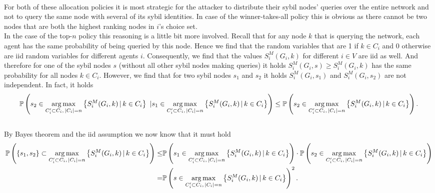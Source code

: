 \begin{remark}[]\ \\
\label{rem:Winner and Top-n Strategies}
\noindent{}For both of these allocation policies it is most strategic for the attacker to distribute their sybil nodes' queries over the entire network and not to query the same node with several of its sybil identities. In case of the winner-takes-all policy this is obvious as there cannot be two nodes that are both the highest ranking nodes in $i$'s choice set. \vspace{1em}\\

\noindent{}In the case of the top-$n$ policy this reasoning is a little bit more involved. Recall that for any node $k$ that is querying the network, each agent has the same probability of being queried by this node. Hence we find that the random variables that are 1 if $k\in{}C_i$ and 0 otherwise are iid random variables for different agents $i$. Consequently, we find that the values $S^M_i(G_i,k)$ for different $i\in{}V$ are iid as well. And therefore for one of the sybil nodes $s$ (without all other sybil nodes making queries) it holds $S^M_i(G_i,s)\geq{}S^M_i(G_i,k)$ has the same probability for all nodes $k\in{}C_i$. However, we find that for two sybil nodes $s_1$ and $s_2$ it holds $S^M_i(G_i,s_1)$ and $S^M_i(G_i,s_2)$ are not independent. In fact, it holds 
\[
\mathbb{P}\left(s_2\in\operatorname*{arg\,max}\limits_{C_i'\subset{}C_i,\,|C_i|=n}\left\lbrace{}S_i^M(G_i,k)\,|\,k\in{}C_i\right\rbrace\,\,   |   s_1\in\operatorname*{arg\,max}\limits_{C_i'\subset{}C_i,\,|C_i|=n}\left\lbrace{}S_i^M(G_i,k)\,|\,k\in{}C_i\right\rbrace\right) \leq \mathbb{P}\left(s_2\in\operatorname*{arg\,max}\limits_{C_i'\subset{}C_i,\,|C_i|=n}\left\lbrace{}S_i^M(G_i,k)\,|\,k\in{}C_i\right\rbrace\right).
\] 
\vspace{1em}\\

\noindent{}By Bayes theorem and the iid assumption we now know that it must hold
\begin{align*}
\mathbb{P}\left(\lbrace{}s_1,s_2\rbrace\subset\operatorname*{arg\,max}\limits_{C_i'\subset{}C_i,\,|C_i|=n}\left\lbrace{}S_i^M(G_i,k)\,|\,k\in{}C_i\right\rbrace\right) \leq & \mathbb{P}\left(s_1\in\operatorname*{arg\,max}\limits_{C_i'\subset{}C_i,\,|C_i|=n}\left\lbrace{}S_i^M(G_i,k)\,|\,k\in{}C_i\right\rbrace\right) \cdot \mathbb{P}\left(s_2\in\operatorname*{arg\,max}\limits_{C_i'\subset{}C_i,\,|C_i|=n}\left\lbrace{}S_i^M(G_i,k)\,|\,k\in{}C_i\right\rbrace\right) \\ = & \mathbb{P}\left(s\in\operatorname*{arg\,max}\limits_{C_i'\subset{}C_i,\,|C_i|=n}\left\lbrace{}S_i^M(G_i,k)\,|\,k\in{}C_i\right\rbrace\right)^2.
\end{align*}



\end{remark}
